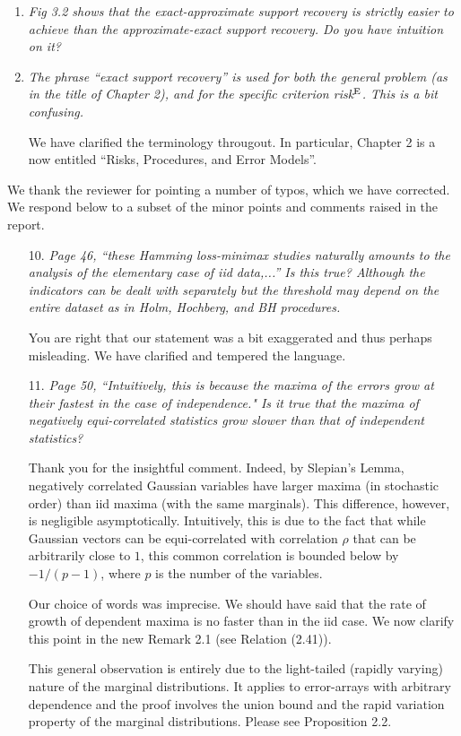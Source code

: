 \documentclass[11pt]{article}
\begin{document}
\begin{enumerate}
\item  {\em Fig 3.2 shows that the exact-approximate support recovery is strictly easier to achieve than the approximate-exact support recovery. 
Do you have intuition on it?}


\item {\em The phrase ``exact support recovery''  is used for both the general problem
(as in the title of Chapter 2), and for the specific criterion risk$^{\rm E}$. This is a bit confusing.}

We have clarified the terminology througout.  In particular, Chapter 2 is a now entitled ``Risks, Procedures, and Error Models''.
   
    \end{enumerate}

We thank the reviewer for pointing a number of typos, which we have corrected.  We respond below to a subset of the minor points
and comments raised in the report.

\medskip
{}
\begin{itemize}
 \item [10.] {\em Page 46, ``these Hamming loss-minimax studies naturally amounts to the analysis of the elementary case of iid data,...'' 
 Is this true? Although the indicators can be dealt with separately but the threshold may depend on the entire dataset as in Holm, 
 Hochberg, and BH procedures. }
 
 You are right that our statement was a bit exaggerated and thus perhaps misleading. We have clarified and tempered the language.
 
 \item[11.]{\em Page 50, ``Intuitively, this is because the maxima of the errors grow at their fastest in the case of independence." Is it true that the maxima of negatively equi-correlated statistics grow slower than that of independent statistics?}
 
  Thank you for the insightful comment.  Indeed, by Slepian's Lemma, negatively correlated Gaussian variables have larger maxima (in stochastic order)
  than iid maxima (with the same marginals).  This difference, however, is negligible asymptotically.  Intuitively, this is due to the fact that while Gaussian
  vectors can be equi-correlated with correlation $\rho$ that can be arbitrarily close to $1$, this common correlation is bounded below by $-1/(p-1)$,
  where $p$ is the number of the variables. 
  
  Our choice of words was imprecise. We should have said that the rate of growth of dependent maxima is no faster than in the iid case.  
  We now clarify this point in the new Remark 2.1 (see Relation (2.41)). 
  
  This general observation is entirely due to the light-tailed (rapidly varying) nature of the marginal distributions.  It applies to error-arrays with arbitrary
  dependence and the proof involves the union bound and the rapid variation property of the marginal distributions.  Please see Proposition 2.2.
   
 
\end{itemize}
\end{document}
